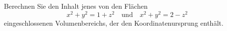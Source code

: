 \begin{atiTask}[
  title = Volumenberechnung III
]
Berechnen Sie den Inhalt jenes von den Flächen
\[
x^2+y^2=1+z^2 \quad \text{und}\quad x^2+y^2=2-z^2
\]
eingeschlossenen Volumenbereichs, der den Koordinatenursprung enthält.
\end{atiTask}